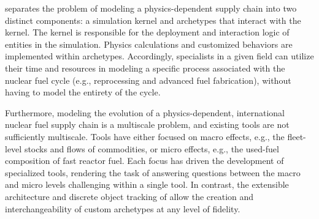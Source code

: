 \Cyclus separates the problem of modeling a
physics-dependent supply chain into two distinct components: a simulation kernel and archetypes that
interact with the kernel. The kernel is responsible for the
deployment and interaction logic of entities in the simulation.  Physics calculations and 
customized behaviors are implemented within archetypes. Accordingly, specialists
in a given field can utilize their time and resources in modeling a specific
process associated with the nuclear fuel cycle (e.g., reprocessing and advanced
fuel fabrication), without having to model the entirety of the cycle.

Furthermore, modeling the evolution of a physics-dependent, international nuclear fuel supply
chain is a multiscale problem, and existing tools are not sufficiently 
multiscale. Tools have either focused on macro effects, e.g., the fleet-level
stocks and flows of commodities, or micro effects, e.g., the used-fuel
composition of fast reactor fuel. Each focus has driven the
development of specialized tools, rendering the task of answering questions between
the macro and micro levels challenging within a single tool. 
In contrast, the extensible architecture and discrete object tracking of \Cyclus allow
the creation and interchangeability of custom archetypes at any level of fidelity.
